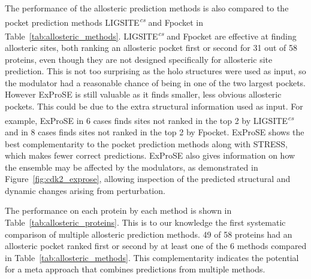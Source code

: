 The performance of the allosteric prediction methods is also compared to the pocket prediction methods LIGSITE\textsuperscript{\it cs} and Fpocket \cite{LeGuilloux2009} in Table~\ref{tab:allosteric_methods}.
LIGSITE\textsuperscript{\it cs} and Fpocket are effective at finding allosteric sites, both ranking an allosteric pocket first or second for 31 out of 58 proteins, even though they are not designed specifically for allosteric site prediction.
This is not too surprising as the holo structures were used as input, so the modulator had a reasonable chance of being in one of the two largest pockets.
However ExProSE is still valuable as it finds smaller, less obvious allosteric pockets.
This could be due to the extra structural information used as input.
For example, ExProSE in 6 cases finds sites not ranked in the top 2 by LIGSITE\textsuperscript{\it cs} and in 8 cases finds sites not ranked in the top 2 by Fpocket.
ExProSE shows the best complementarity to the pocket prediction methods along with STRESS, which makes fewer correct predictions.
ExProSE also gives information on how the ensemble may be affected by the modulators, as demonstrated in Figure~\ref{fig:cdk2_exprose}, allowing inspection of the predicted structural and dynamic changes arising from perturbation.

The performance on each protein by each method is shown in Table~\ref{tab:allosteric_proteins}.
This is to our knowledge the first systematic comparison of multiple allosteric prediction methods.
49 of 58 proteins had an allosteric pocket ranked first or second by at least one of the 6 methods compared in Table~\ref{tab:allosteric_methods}.
This complementarity indicates the potential for a meta approach that combines predictions from multiple methods.


